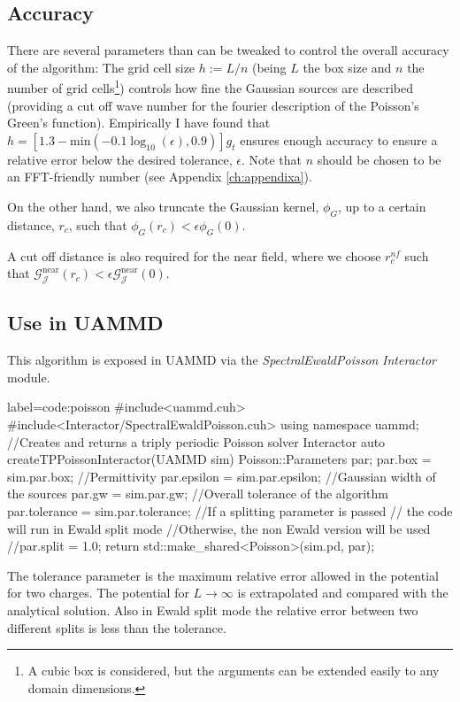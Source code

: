 \documentclass[twoside,openright,titlepage,numbers=noenddot,%
headinclude,footinclude,cleardoublepage=empty,abstract=on,
BCOR=5mm,fontsize=11pt, dvipsnames, paper=b5
]{scrreprt}
\newcommand{\oper}[1]{\mathcal{#1}}
\newcommand{\uammd}{\gls{UAMMD}\xspace}
\newcommand{\near}{\textrm{near}}
\begin{document}
\subsection*{Accuracy}
There are several parameters than can be tweaked to control the overall accuracy of the algorithm:
The grid cell size $h:=L/n$ (being $L$ the box size and $n$ the number of grid cells\footnote{A cubic box is considered, but the arguments can be extended easily to any domain dimensions.}) controls how fine the Gaussian sources are described (providing a cut off wave number for the fourier description of the Poisson's Green's function). Empirically I have found that $h = \left[1.3 - \text{min}\left(-0.1\log_{10}(\epsilon), 0.9\right)\right]g_t$ ensures enough accuracy to ensure a relative error below the desired tolerance, $\epsilon$.
Note that $n$ should be chosen to be an \gls{FFT}-friendly number (see Appendix \ref{ch:appendixa}).

On the other hand, we also truncate the Gaussian kernel, $\phi_G$, up to a certain distance, $r_c$, such that $\phi_G(r_c)< \epsilon\phi_G(0)$.

A cut off distance is also required for the near field, where we choose $r_c^{nf}$ such that $\oper{G}_{\oper{J}}^{\near}(r_c) < \epsilon\oper{G}_{\oper{J}}^{\near}(0)$.


\subsection*{Use in UAMMD}

This algorithm is exposed in \uammd via the \emph{SpectralEwaldPoisson} \emph{Interactor} module.

\begin{code2}{label=code:poisson}
#include<uammd.cuh>
#include<Interactor/SpectralEwaldPoisson.cuh>
using namespace uammd;
//Creates and returns a triply periodic Poisson solver Interactor
auto createTPPoissonInteractor(UAMMD sim){
  Poisson::Parameters par;
  par.box = sim.par.box;
  //Permittivity
  par.epsilon = sim.par.epsilon;
  //Gaussian width of the sources
  par.gw = sim.par.gw; 
  //Overall tolerance of the algorithm
  par.tolerance = sim.par.tolerance;
  //If a splitting parameter is passed
  // the code will run in Ewald split mode
  //Otherwise, the non Ewald version will be used
  //par.split = 1.0;
  return std::make_shared<Poisson>(sim.pd, par);
}
\end{code2}
The tolerance parameter is the maximum relative error allowed in the potential for two charges. The potential for $L\rightarrow\infty$ is extrapolated and compared with the analytical solution. Also in Ewald split mode the relative error between two different splits is less than the tolerance.
\end{document}
